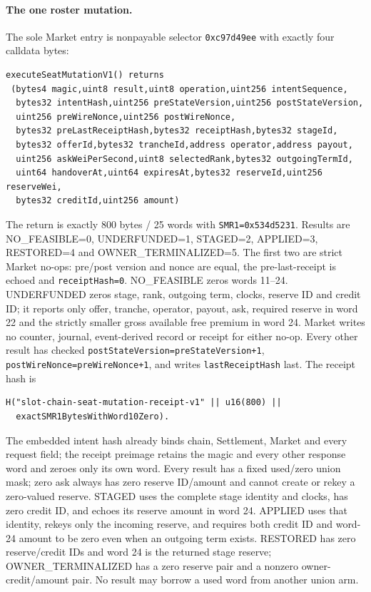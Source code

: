 \documentclass[a4paper,11pt]{article}
\newcommand{\code}[1]{\nolinkurl{#1}}
\begin{document}
\paragraph{The one roster mutation.}
The sole Market entry is nonpayable selector \code{0xc97d49ee} with exactly
four calldata bytes:
\begin{verbatim}
executeSeatMutationV1() returns
 (bytes4 magic,uint8 result,uint8 operation,uint256 intentSequence,
  bytes32 intentHash,uint256 preStateVersion,uint256 postStateVersion,
  uint256 preWireNonce,uint256 postWireNonce,
  bytes32 preLastReceiptHash,bytes32 receiptHash,bytes32 stageId,
  bytes32 offerId,bytes32 trancheId,address operator,address payout,
  uint256 askWeiPerSecond,uint8 selectedRank,bytes32 outgoingTermId,
  uint64 handoverAt,uint64 expiresAt,bytes32 reserveId,uint256 reserveWei,
  bytes32 creditId,uint256 amount)
\end{verbatim}
The return is exactly 800 bytes / 25 words with
\code{SMR1=0x534d5231}.  Results are NO\_FEASIBLE=0, UNDERFUNDED=1, STAGED=2,
APPLIED=3, RESTORED=4 and OWNER\_TERMINALIZED=5.  The first two are strict
Market no-ops: pre/post version and nonce are equal, the pre-last-receipt is
echoed and \code{receiptHash=0}.  NO\_FEASIBLE zeros words 11--24.
UNDERFUNDED zeros stage, rank, outgoing term, clocks, reserve ID and credit ID;
it reports only offer, tranche, operator, payout, ask, required reserve in word
22 and the strictly smaller gross available free premium in word 24.  Market
writes no counter, journal, event-derived record or receipt for either no-op.
Every other result
has checked \code{postStateVersion=preStateVersion+1},
\code{postWireNonce=preWireNonce+1}, and writes \code{lastReceiptHash} last.
The receipt hash is
\begin{verbatim}
H("slot-chain-seat-mutation-receipt-v1" || u16(800) ||
  exactSMR1BytesWithWord10Zero).
\end{verbatim}
The embedded intent hash already binds chain, Settlement, Market and every
request field; the receipt preimage retains the magic and every other response
word and zeroes only its own word.  Every result has a fixed
used/zero union mask; zero ask always has zero reserve ID/amount and cannot
create or rekey a zero-valued reserve.  STAGED uses the complete stage identity
and clocks, has zero credit ID, and echoes its reserve amount in word 24.
APPLIED uses that identity, rekeys only the incoming reserve, and requires both
credit ID and word-24 amount to be zero even when an outgoing term exists.
RESTORED has zero reserve/credit IDs and word 24 is the returned stage reserve;
OWNER\_TERMINALIZED has a zero reserve pair and a nonzero owner-credit/amount
pair.  No result may borrow a used word from another union arm.
\end{document}

